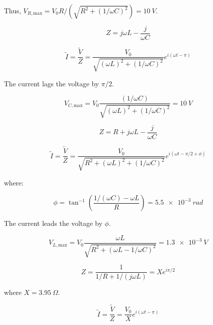 \documentclass[12pt]{article}
\begin{document}
Thus, $V_{R, \text{max}} = V_{0} R/(\sqrt{R^{2} + (1/\omega C)^{2}}) = \qty{10}{V}$.


\begin{equation}
    Z = j \omega L - \frac{j}{\omega C}
\end{equation}

\begin{equation}
    \tilde{I} = \frac{\tilde{V}}{Z} = \frac{V_{0}}{\sqrt{(\omega L)^{2} + (1/\omega C)^{2}}} e^{i(\omega t - \pi)}
\end{equation}

The current lags the voltage by $\pi/2$.

\begin{equation}
    V_{C, \text{max}} = V_{0} \frac{(1/\omega C)}{\sqrt{(\omega L)^{2} + (1/\omega C)^{2}}} = \qty{10}{V}
\end{equation}


\begin{equation}
    Z = R + j \omega L - \frac{j}{\omega C}
\end{equation}

\begin{equation}
    \tilde{I} = \frac{\tilde{V}}{Z} = \frac{V_{0}}{\sqrt{R^{2} + (\omega L)^{2} + (1/\omega C)^{2}}} e^{i(\omega t - \pi/2 + \phi)}
\end{equation}

where:

\begin{equation}
    \phi = \tan^{-1}{\left( \frac{1/(\omega C) - \omega L}{R} \right)} = \qty{5.5e-3}{rad}
\end{equation}

The current leads the voltage by $\phi$.

\begin{equation}
    V_{L, \text{max}} = V_{0} \frac{\omega L}{\sqrt{R^{2} + (\omega L - 1/\omega C)^{2}}} = \qty{1.3e-3}{V}
\end{equation}


\begin{equation}
    Z = \frac{1}{1/R + 1/(j \omega L)} = X e^{i\pi/2}
\end{equation}

where $X = \qty{3.95}{\Omega}$.

\begin{equation}
    \tilde{I} = \frac{\tilde{V}}{Z} = \frac{V_{0}}{X} e^{i(\omega t - \pi)}
\end{equation}
\end{document}
